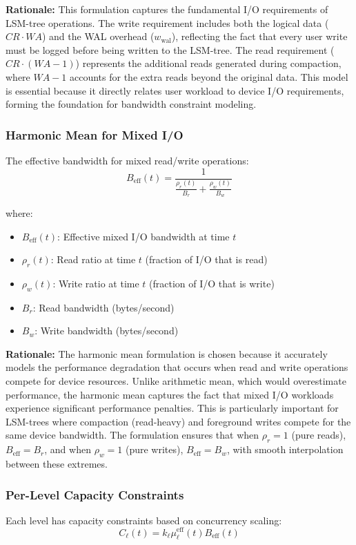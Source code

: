 \documentclass[11pt]{article}
\newcommand{\mueff}{\mu^{\text{eff}}}
\begin{document}
\textbf{Rationale:} This formulation captures the fundamental I/O requirements of LSM-tree operations. The write requirement includes both the logical data ($CR \cdot WA$) and the WAL overhead ($w_{\text{wal}}$), reflecting the fact that every user write must be logged before being written to the LSM-tree. The read requirement ($CR \cdot (WA - 1)$) represents the additional reads generated during compaction, where $WA - 1$ accounts for the extra reads beyond the original data. This model is essential because it directly relates user workload to device I/O requirements, forming the foundation for bandwidth constraint modeling.

\subsubsection{Harmonic Mean for Mixed I/O}
The effective bandwidth for mixed read/write operations:
\begin{equation}
B_{\text{eff}}(t) = \frac{1}{\frac{\rho_r(t)}{B_r} + \frac{\rho_w(t)}{B_w}}
\end{equation}

where:
\begin{itemize}
    \item $B_{\text{eff}}(t)$: Effective mixed I/O bandwidth at time $t$
    \item $\rho_r(t)$: Read ratio at time $t$ (fraction of I/O that is read)
    \item $\rho_w(t)$: Write ratio at time $t$ (fraction of I/O that is write)
    \item $B_r$: Read bandwidth (bytes/second)
    \item $B_w$: Write bandwidth (bytes/second)
\end{itemize}

\textbf{Rationale:} The harmonic mean formulation is chosen because it accurately models the performance degradation that occurs when read and write operations compete for device resources. Unlike arithmetic mean, which would overestimate performance, the harmonic mean captures the fact that mixed I/O workloads experience significant performance penalties. This is particularly important for LSM-trees where compaction (read-heavy) and foreground writes compete for the same device bandwidth. The formulation ensures that when $\rho_r = 1$ (pure reads), $B_{\text{eff}} = B_r$, and when $\rho_w = 1$ (pure writes), $B_{\text{eff}} = B_w$, with smooth interpolation between these extremes.

\subsubsection{Per-Level Capacity Constraints}
Each level has capacity constraints based on concurrency scaling:
\begin{equation}
C_\ell(t) = k_\ell \mueff_\ell(t) B_{\text{eff}}(t)
\end{equation}
\end{document}
